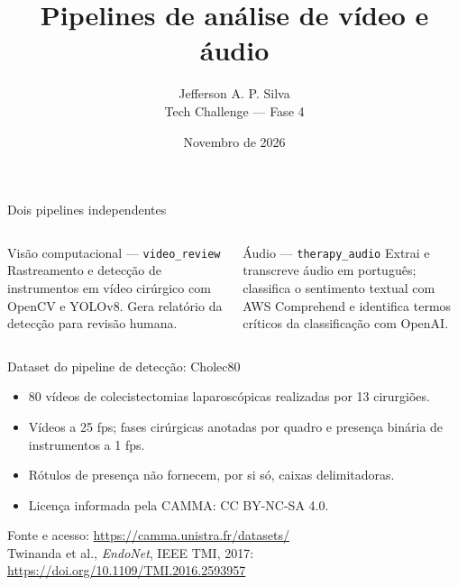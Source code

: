 \documentclass[aspectratio=169,11pt]{beamer}
\title{Pipelines de análise de vídeo e áudio}
\subtitle{}
\author{Jefferson A. P. Silva\\Tech Challenge — Fase 4}
\date{Novembro de 2026}
\begin{document}
\begin{frame}
  \titlepage
\end{frame}

\begin{frame}{Dois pipelines independentes}
  \begin{columns}[T,onlytextwidth]
      \begin{block}{Visão computacional — \texttt{video\_review}}
        Rastreamento e detecção de instrumentos em vídeo cirúrgico com OpenCV e YOLOv8. Gera relatório da detecção para revisão humana.
      \end{block}
      \begin{block}{Áudio — \texttt{therapy\_audio}}
        Extrai e transcreve áudio em português; classifica o sentimento textual com AWS Comprehend e identifica termos críticos da classificação com OpenAI.
      \end{block}
  \end{columns}
  \vspace{0.5em}
\end{frame}

\begin{frame}{Dataset do pipeline de detecção: Cholec80}
  \begin{itemize}
    \item 80 vídeos de colecistectomias laparoscópicas realizadas por 13 cirurgiões.
    \item Vídeos a 25 fps; fases cirúrgicas anotadas por quadro e presença binária de instrumentos a 1 fps.
    \item Rótulos de presença não fornecem, por si só, caixas delimitadoras.
    \item Licença informada pela CAMMA: CC BY-NC-SA 4.0.
  \end{itemize}
  \vfill
  {\scriptsize
  Fonte e acesso: \url{https://camma.unistra.fr/datasets/}\\
  Twinanda et al., \textit{EndoNet}, IEEE TMI, 2017: \url{https://doi.org/10.1109/TMI.2016.2593957}}
\end{frame}
\end{document}
